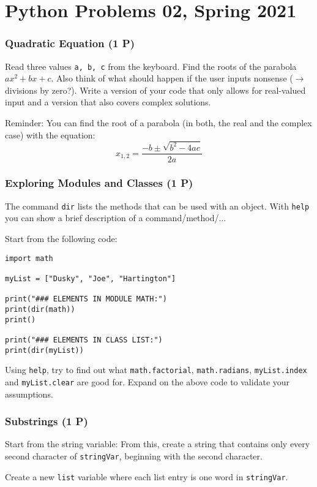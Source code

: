 \documentclass[
	ngerman,
	fontsize=10pt,
	parskip=half,
	titlepage=true,
	DIV=12
]{scrartcl}
\newcommand*{\inPy}[1]{\texttt{#1}}
\begin{document}
\part*{Python Problems 02, Spring 2021}
\section{Quadratic Equation (1 P)}
Read three values \inPy{a, b, c} from the keyboard. Find the roots of the parabola $ax^2 + bx +c$. Also think of what should happen if the user inputs nonsense ($\rightarrow$ divisions by zero?). Write a version of your code that only allows for real-valued input and a version that also covers complex solutions.

Reminder: You can find the root of a parabola (in both, the real and the complex case) with the equation:
\[ x_{1,2} = \frac{-b \pm \sqrt{b^2 - 4ac}}{2a} \]


\section{Exploring Modules and Classes (1 P)}
The command \inPy{dir} lists the methods that can be used with an object. With \inPy{help} you can show a brief description of a command/method/...

Start from the following code:
\begin{verbatim}
import math

myList = ["Dusky", "Joe", "Hartington"]

print("### ELEMENTS IN MODULE MATH:")
print(dir(math))
print()

print("### ELEMENTS IN CLASS LIST:")
print(dir(myList))
\end{verbatim}

Using \inPy{help}, try to find out what \inPy{math.factorial}, \inPy{math.radians}, \inPy{myList.index} and \inPy{myList.clear} are good for. Expand on the above code to validate your assumptions.


\section{Substrings (1 P)}
Start from the string variable:
From this, create a string that contains only every second character of \texttt{stringVar}, beginning with the second character.

Create a new \inPy{list} variable where each list entry is one word in \texttt{stringVar}.
\end{document}
